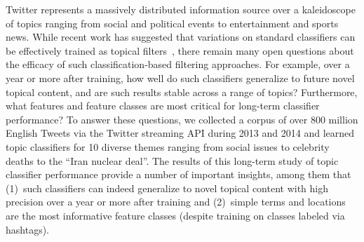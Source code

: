 
Twitter represents a massively distributed information source over a kaleidoscope of topics ranging from social and political events to entertainment and sports news.  While recent work has suggested that variations on standard classifiers can be effectively trained as topical filters~\cite{lin2011smoothing,yang2014large,magdy}, there remain many open questions about the efficacy of such classification-based filtering approaches.  For example, over a year or more after training, how well do such classifiers generalize to future novel topical content, and are such results stable across a range of topics?  Furthermore, what features and feature classes are most critical for long-term classifier performance?  To answer these questions, we collected a corpus of over 800 million English Tweets via the Twitter streaming API during 2013 and 2014 and learned topic classifiers for 10 diverse themes ranging from social issues to celebrity deaths to the ``Iran nuclear deal''.  The results of this long-term study of topic classifier performance provide a number of important insights, among them that (1)~such classifiers can indeed generalize to novel topical content with high precision over a year or more after training and (2)~simple terms and locations are the most informative feature classes (despite training on classes labeled via hashtags).  
